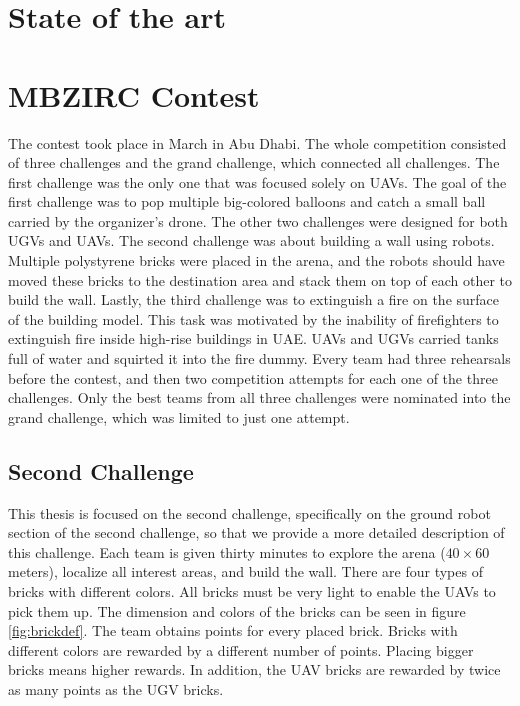 \section{State of the art}


\section{MBZIRC Contest}
The contest took place in March in Abu Dhabi. The whole competition consisted of three challenges and the grand challenge, which connected all challenges. The first challenge was the only one that was focused solely on UAVs. The goal of the first challenge was to pop multiple big-colored balloons and catch a small ball carried by the organizer's drone. The other two challenges were designed for both UGVs and UAVs. The second challenge was about building a wall using robots. Multiple polystyrene bricks were placed in the arena, and the robots should have moved these bricks to the destination area and stack them on top of each other to build the wall. Lastly, the third challenge was to extinguish a fire on the surface of the building model. This task was motivated by the inability of firefighters to extinguish fire inside high-rise buildings in UAE. UAVs and UGVs carried tanks full of water and squirted it into the fire dummy. Every team had three rehearsals before the contest, and then two competition attempts for each one of the three challenges. Only the best teams from all three challenges were nominated into the grand challenge, which was limited to just one attempt.

\subsection{Second Challenge}
This thesis is focused on the second challenge, specifically on the ground robot section of the second challenge, so that we provide a more detailed description of this challenge. Each team is given thirty minutes to explore the arena ($40 \times 60$ meters), localize all interest areas, and build the wall. There are four types of bricks with different colors. All bricks must be very light to enable the UAVs to pick them up. The dimension and colors of the bricks can be seen in figure \ref{fig:brickdef}. The team obtains points for every placed brick. Bricks with different colors are rewarded by a different number of points. Placing bigger bricks means higher rewards. In addition, the UAV bricks are rewarded by twice as many points as the UGV bricks.

